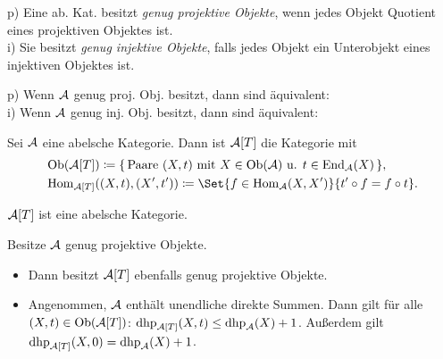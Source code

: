 \documentclass{cheat-sheet}
\DeclareMathOperator{\dhp}{dhp} %
\DeclareMathOperator{\dhi}{dhi} %
\begin{document}
\begin{defn}
  p) \enspace Eine ab. Kat. besitzt \emph{genug projektive Objekte}, wenn jedes Objekt Quotient eines projektiven Objektes ist. \\
  i) \enspace Sie besitzt \emph{genug injektive Objekte}, falls jedes Objekt ein Unterobjekt eines injektiven Objektes ist.
\end{defn}

\begin{kor}
  p) \enspace Wenn $\mathcal{A}$ genug proj. Obj. besitzt, dann sind äquivalent: %
  \inlineitem{$\dhp(X) \leq k$} \enspace
   \\[2pt]
  i) \enspace Wenn $\mathcal{A}$ genug inj. Obj. besitzt, dann sind äquivalent: %
  \inlineitem{$\dhi(X) \leq k$} \enspace
   \\[2pt]
\end{kor}


\begin{defn}
  Sei $\mathcal{A}$ eine abelsche Kategorie. Dann ist $\mathcal{A}[T]$ die Kategorie mit
  \begin{align*}
    & \Ob(\Aat[T]) \coloneqq \{\, \text{Paare $(X, t)$ mit $X \in \Ob(\Aat)$ u. $t \in \End_\Aat(X)$} \,\}, \\
    & \Hom_{\Aat[T]}((X, t), (X', t')) \coloneqq \Set{f \in \Hom_\Aat(X, X')}{t' \circ f = f \circ t}.
  \end{align*}
\end{defn}

\begin{thm}
  $\mathcal{A}[T]$ ist eine abelsche Kategorie.
\end{thm}

\begin{lem}
  Besitze $\mathcal{A}$ genug projektive Objekte.
  \begin{itemize}
    \item Dann besitzt $\mathcal{A}[T]$ ebenfalls genug projektive Objekte.
    \item Angenommen, $\mathcal{A}$ enthält unendliche direkte Summen.
    Dann gilt für alle $(X, t) \in \operatorname{Ob}(\mathcal{A}[T])$: \enspace
    $\dhp_{\Aat[T]}(X, t) \leq \dhp_\Aat(X) + 1$.
    Außerdem gilt $\dhp_{\Aat[T]}(X, 0) = \dhp_\Aat(X) + 1$.
  \end{itemize}
\end{lem}
\end{document}
